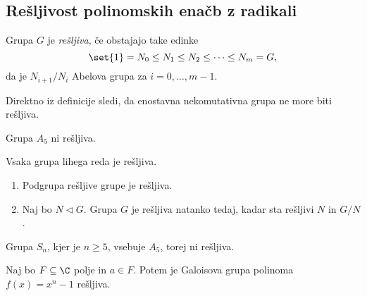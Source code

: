 %    

\subsection{Rešljivost polinomskih enačb z radikali}

\begin{definicija}
    Grupa $G$ je \emph{rešljiva}, če obstajajo take edinke 
    \[
        \set{1} = N_0 \le N_1 \le N_2 \le \dots \le N_m = G,
    \]
    da je $N_{i+1}/N_i$ Abelova grupa za $i = 0, \dots, m-1$.
\end{definicija}

Direktno iz definicije sledi, da enostavna nekomutativna
grupa ne more biti rešljiva.

\begin{primer}
    Grupa $A_5$ ni rešljiva.
\end{primer}

\begin{izrek}
    Vsaka grupa lihega reda je rešljiva.    
\end{izrek}


\begin{trditev}
    \begin{enumerate}
        \item Podgrupa rešljive grupe je rešljiva.
        \item Naj bo $N \triangleleft G$. Grupa $G$ 
        je rešljiva natanko tedaj, kadar sta rešljivi 
        $N$ in $G/N$.
    \end{enumerate}
\end{trditev}


\begin{primer}
    Grupa $S_n$, kjer je $n \ge 5$, vsebuje $A_5$, torej ni rešljiva.
\end{primer}

\begin{lema}
    Naj bo $F \subseteq \C$ polje in $a \in F$. Potem 
    je Galoisova grupa polinoma $f(x) = x^n - 1$ rešljiva.
\end{lema}

%    

